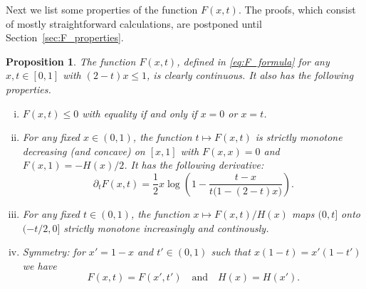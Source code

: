\documentclass[12pt]{amsart}
\newtheorem{proposition}[theorem]{Proposition}
\theoremstyle{definition}
\begin{document}
Next we list some properties of the function $F(x,t)$. The proofs, which consist of mostly straightforward calculations, are postponed until Section~\ref{sec:F_properties}. 
%
\begin{proposition} \label{prop:F_properties}
The function $F(x,t)$, defined in \eqref{eq:F_formula} for any $x,t \in [0,1]$ with $(2-t)x \leq 1$, is clearly continuous. It also has the following properties.
%
\begin{enumerate}[(i)]
\item $F(x,t) \leq 0$ with equality if and only if $x=0$ or $x=t$.
\item For any fixed $x \in (0,1)$, the function $t \mapsto F(x,t)$ is strictly monotone decreasing (and concave) on $[x,1]$ with $F(x,x)=0$ and $F(x,1)=-H(x)/2$. It has the following derivative:
\[ \partial_t F(x,t) 
= \frac12 x \log \left( 1- \frac{t-x}{t \big( 1-(2-t)x \big)} \right) . \]
\item For any fixed $t \in (0,1)$, the function $x \mapsto F(x,t) \big/ H(x)$ maps $(0,t]$ onto $(-t/2,0]$ strictly monotone increasingly and continously. 
\item Symmetry: for $x'=1-x$ and $t'\in (0,1)$ such that $x(1-t)=x'(1-t')$ we have 
%
\[ F(x,t)=F(x',t') 
\quad \text{and} \quad 
H(x)=H(x') .\]
%
\end{enumerate}
%
\end{proposition}
%
\end{document}
